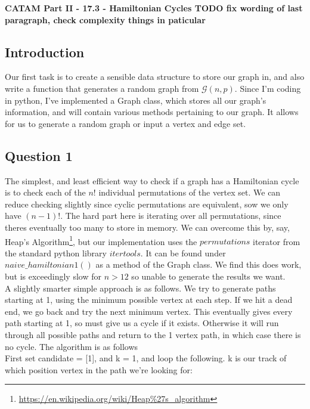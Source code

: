 \documentclass[10pt,a4paper]{report}
\begin{document}
\textbf{CATAM Part II - 17.3 - Hamiltonian Cycles TODO fix wording of last paragraph, check complexity things in paticular}
\thispagestyle{empty}

\newpage

\subsection*{Introduction}

Our first task is to create a sensible data structure to store our graph in, and also write a function that generates a random graph from $\mathcal{G}(n,p)$. Since I'm coding in python, I've implemented a Graph class, which stores all our graph's information, and will contain various methods pertaining to our graph. It allows for us to generate a random graph or input a vertex and edge set.

\subsection*{Question 1}	

The simplest, and least efficient way to check if a graph has a Hamiltonian cycle is to check each of the $n!$ individual permutations of the vertex set. We can reduce checking slightly since cyclic permutations are equivalent, sow we only have $(n-1)!$. The hard part here is iterating over all permutations, since theres eventually too many to store in memory. We can overcome this by, say, Heap's Algorithm\footnote{\url{https://en.wikipedia.org/wiki/Heap\%27s_algorithm}}, but our implementation uses the $permutations$ iterator from the standard python library $itertools$.  It can be found under $naive\_hamiltonian1()$ as a method of the Graph class. We find this does work, but is exceedingly slow for $n>12$ so unable to generate the results we want. \\

A slightly smarter simple approach is as follows. We try to generate paths starting at 1, using the minimum possible vertex at each step. If we hit a dead end, we go back and try the next minimum vertex. This eventually gives every path starting at 1, so must give us a cycle if it exists. Otherwise it will run through all possible paths and return to the 1 vertex path, in which case there is no cycle. The algorithm is as follows\\
 
First set candidate = [1], and k = 1, and loop the following. k is our track of which position vertex in the path we're looking for:\\
\end{document}
